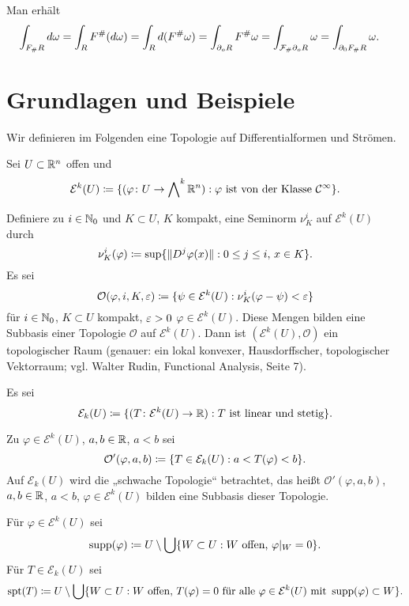 \documentclass[a4paper,twoside,DIV15,BCOR12mm]{scrbook}
\newcommand{\bw}{\bigwedge\nolimits}
\DeclareMathOperator{\supp}{supp}
\DeclareMathOperator{\spt}{spt}
\begin{document}
\begin{beweis}
Man erhält
\begin{align*}
\int_{F_\# R} d\omega &= \int_R F^\#(d\omega) 
= \int_R d (F^\#\omega)
= \int_{\partial_oR} F^\# \omega 
= \int_{\mathcal{F}_\#\partial_oR} \omega 
= \int_{\partial_0 F_\#R} \omega.
\end{align*}
\end{beweis}

\section{Grundlagen und Beispiele}

Wir definieren im Folgenden eine Topologie auf Differentialformen und Strömen.

Sei $U\subset \mathbb{R}^n$ offen und
\[
\mathcal E^k(U)\da \{ (\varphi\colon U\to \bw^k\MdR^n) : \varphi \text{ ist von der Klasse }\mathcal C^\infty\}.
\]

Definiere zu $i\in\mathbb{N}_0$ und $K\subset U$, $K$ kompakt, eine Seminorm $\nu_K^i$ auf $\mathcal E^k(U)$ durch
\[
\nu^i_K(\varphi) \da \sup \{\|D^j\varphi(x)\| : 0 \le j \le i,\, x\in K\}.
\]
Es sei
\[
\mathcal O(\varphi, i, K,\ep) \da \{\psi \in \mathcal E^k(U) : \nu_K^i(\varphi-\psi) < \ep\}
\]
für $i\in\mathbb{N}_0$, $K\subset U$ kompakt, $\varepsilon>0$ $\varphi \in \mathcal E^k(U)$. Diese Mengen bilden eine Subbasis einer Topologie $\mathcal O$ auf $\mathcal E^k(U)$. Dann ist $(\mathcal E^k(U),\mathcal O)$ ein topologischer Raum (genauer: ein lokal konvexer, Hausdorffscher, topologischer Vektorraum; vgl. Walter Rudin, Functional Analysis, Seite 7).

\begin{definition}
Es sei
\[
\mathcal E_k(U) \da \{( T\colon \mathcal E^k(U) \to \MdR) : T\text{ ist linear und stetig}\}.
\]
\end{definition}

Zu $\varphi \in \mathcal E^k(U)$, $a,b\in \mathbb{R}$, $a<b$ sei
\[
\mathcal O'(\varphi,a,b) \da \{ T\in \mathcal E_k(U) : a < T(\varphi) < b\}.
\]
Auf $\mathcal E_k(U)$ wird die „schwache Topologie“ betrachtet, das heißt $\mathcal O'(\varphi,a,b)$, $a,b\in \mathbb{R}$, $a<b$, $\varphi \in \mathcal E^k(U)$ bilden eine Subbasis dieser Topologie.

\begin{definition}[Träger]
Für $\varphi \in \mathcal E^k(U)$ sei
\[
\supp(\varphi) \da U \setminus \bigcup \{ W\subset U: \text{$W$ offen, } \varphi|_W = 0\}.
\]
Für $T\in \mathcal E_k(U)$ sei
\[
\spt(T) \da U \setminus \bigcup \{ W\subset U: \text{$W$ offen, } T(\varphi)=0 \text{ für alle }\varphi \in \mathcal E^k(U) \text{ mit } \supp(\varphi)\subset W\}.
\]
\end{definition}
\end{document}
